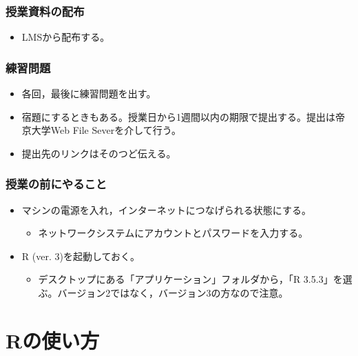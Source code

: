 \documentclass[]{article}
\providecommand{\tightlist}{%
  \setlength{\itemsep}{0pt}\setlength{\parskip}{0pt}}
\begin{document}
\subsubsection{授業資料の配布}

\begin{itemize}
\tightlist
\item
  LMSから配布する。
\end{itemize}

\subsubsection{練習問題}

\begin{itemize}
\tightlist
\item
  各回，最後に練習問題を出す。\\
\item
  宿題にするときもある。授業日から1週間以内の期限で提出する。提出は帝京大学Web
  File Severを介して行う。\\
\item
  提出先のリンクはそのつど伝える。
\end{itemize}

\subsubsection{授業の前にやること}

\begin{itemize}
\tightlist
\item
  マシンの電源を入れ，インターネットにつなげられる状態にする。

  \begin{itemize}
  \tightlist
  \item
    ネットワークシステムにアカウントとパスワードを入力する。\\
  \end{itemize}
\item
  R (ver. 3)を起動しておく。

  \begin{itemize}
  \tightlist
  \item
    デスクトップにある「アプリケーション」フォルダから，「R
    3.5.3」を選ぶ。バージョン2ではなく，バージョン3の方なので注意。
  \end{itemize}
\end{itemize}

\section{Rの使い方}\label{r}
\end{document}
